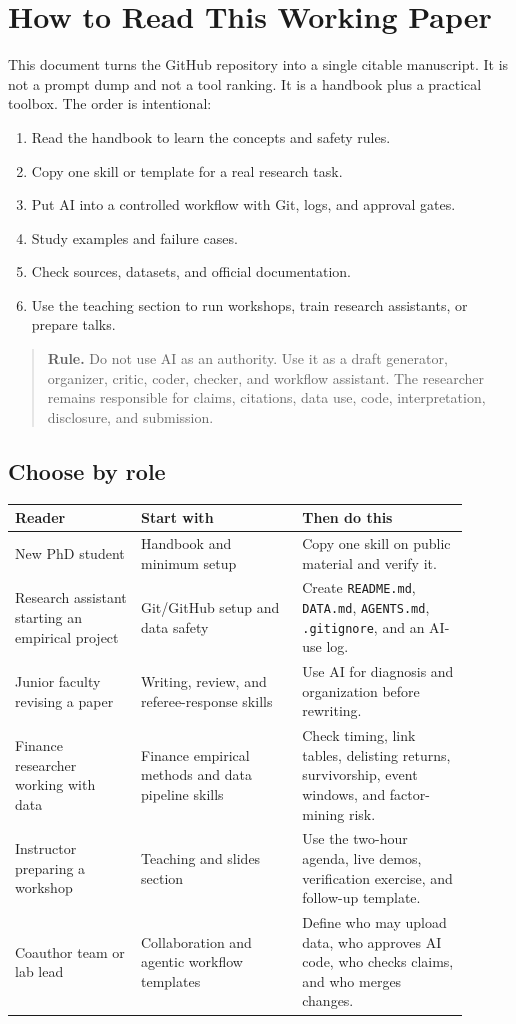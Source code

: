 \documentclass[11pt]{article}
\newcommand{\rulebox}[1]{\begin{quote}\noindent\textcolor{ruleblue}{\textbf{Rule.}} #1\end{quote}}
\begin{document}
\tableofcontents
\newpage

\section{How to Read This Working Paper}

This document turns the GitHub repository into a single citable manuscript. It is not a prompt dump and not a tool ranking. It is a handbook plus a practical toolbox. The order is intentional:

\begin{enumerate}[leftmargin=2em]
  \item Read the handbook to learn the concepts and safety rules.
  \item Copy one skill or template for a real research task.
  \item Put AI into a controlled workflow with Git, logs, and approval gates.
  \item Study examples and failure cases.
  \item Check sources, datasets, and official documentation.
  \item Use the teaching section to run workshops, train research assistants, or prepare talks.
\end{enumerate}

\rulebox{Do not use AI as an authority. Use it as a draft generator, organizer, critic, coder, checker, and workflow assistant. The researcher remains responsible for claims, citations, data use, code, interpretation, disclosure, and submission.}

\subsection{Choose by role}

\begin{longtable}{p{0.25\linewidth}p{0.32\linewidth}p{0.33\linewidth}}
\toprule
\textbf{Reader} & \textbf{Start with} & \textbf{Then do this}\\
\midrule
New PhD student & Handbook and minimum setup & Copy one skill on public material and verify it.\\
Research assistant starting an empirical project & Git/GitHub setup and data safety & Create \texttt{README.md}, \texttt{DATA.md}, \texttt{AGENTS.md}, \texttt{.gitignore}, and an AI-use log.\\
Junior faculty revising a paper & Writing, review, and referee-response skills & Use AI for diagnosis and organization before rewriting.\\
Finance researcher working with data & Finance empirical methods and data pipeline skills & Check timing, link tables, delisting returns, survivorship, event windows, and factor-mining risk.\\
Instructor preparing a workshop & Teaching and slides section & Use the two-hour agenda, live demos, verification exercise, and follow-up template.\\
Coauthor team or lab lead & Collaboration and agentic workflow templates & Define who may upload data, who approves AI code, who checks claims, and who merges changes.\\
\bottomrule
\end{longtable}
\end{document}
